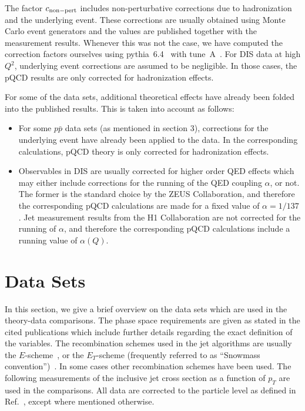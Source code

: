 \documentclass[11pt]{article}
\newcommand{\pythia}{{\sc pythia}}
\newcommand{\ppbar}{p{\bar{p}}}
\begin{document}
The factor $c_{\rm non-pert}$ includes non-perturbative corrections 
due to hadronization and the underlying event.
These corrections are usually obtained using Monte Carlo event generators
and the values are published together with the measurement results.
Whenever this was not the case,  we have computed the correction factors 
ourselves using \pythia\ 6.4~\cite{pythia} with tune~A~\cite{tunea}.
For DIS data at high $Q^2$, underlying event corrections are assumed
to be negligible.
In those cases, the pQCD results are only corrected for hadronization effects.


\bigskip

For some of the data sets, additional theoretical effects have already
been folded into the published results.
This is taken into account as follows:  

\begin{itemize}

\item
For some $\ppbar$ data sets (as mentioned in section 3), 
corrections for the underlying event have already been applied to the data.
In the corresponding calculations, pQCD theory is only corrected for 
hadronization effects.

\item
Observables in DIS are usually corrected for higher order QED effects
which may either include corrections for the running of the QED coupling
$\alpha$, or not.
The former is the standard choice by the ZEUS Collaboration, 
and therefore the corresponding pQCD calculations
are made for a fixed value of $\alpha = 1/137$.
Jet measurement results from the H1 Collaboration are not corrected
for the running of $\alpha$, and therefore the corresponding
pQCD calculations include a running value of $\alpha(Q)$.

\end{itemize}

\section{\label{sec:data}Data Sets}

In this section, we give a brief overview on the data sets
which are used in the theory-data comparisons.
The phase space requirements are given as stated in the cited publications
which include further details regarding the exact definition 
of the variables.
%
The recombination schemes used in the jet algorithms are usually the
 $E$-scheme~\cite{run2cone}, 
or the $E_T$-scheme (frequently referred to 
as ``Snowmass convention'')~\cite{Huth:1990mi}.
In some cases other recombination schemes have been used.
%
The following measurements of the inclusive jet cross section
as a function of $p_T$ are used in the comparisons. 
All data are corrected to the particle level as defined 
in Ref.~\cite{Buttar:2008jx}, except where mentioned otherwise.
\end{document}
